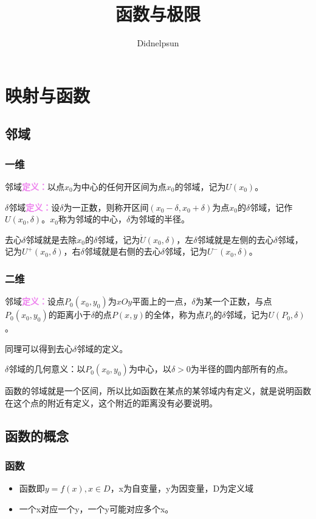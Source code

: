 \documentclass[UTF8, 12pt]{ctexart}
\author{Didnelpsun}
\title{函数与极限}
\date{}
\begin{document}
\renewcommand{\arraystretch}{1.5}
\maketitle
\pagestyle{empty}
\thispagestyle{empty}
\tableofcontents
\thispagestyle{empty}
\newpage
\pagestyle{plain}
\setcounter{page}{1}
\section{映射与函数}
\subsection{邻域}
\subsubsection{一维}

邻域\textcolor{violet}{\textbf{定义：}}以点$x_0$为中心的任何开区间为点$x_0$的邻域，记为$U(x_0)$。

$\delta$邻域\textcolor{violet}{\textbf{定义：}}设$\delta$为一正数，则称开区间$(x_0-\delta,x_0+\delta)$为点$x_0$的$\delta$邻域，记作$U(x_0,\delta)$。$x_0$称为邻域的中心，$\delta$为邻域的半径。

去心$\delta$邻域就是去除$x_0$的$\delta$邻域，记为$\mathring{U}(x_0,\delta)$，左$\delta$邻域就是左侧的去心$\delta$邻域，记为$U^+(x_0,\delta)$，右$\delta$邻域就是右侧的去心$\delta$邻域，记为$U^-(x_0,\delta)$。

\subsubsection{二维}

邻域\textcolor{violet}{\textbf{定义：}}设点$P_0(x_0,y_0)$为$xOy$平面上的一点，$\delta$为某一个正数，与点$P_0(x_0,y_0)$的距离小于$\delta$的点$P(x,y)$的全体，称为点$P_0$的$\delta$邻域，记为$U(P_0,\delta)$。

同理可以得到去心$\delta$邻域的定义。

$\delta$邻域的几何意义：以$P_0(x_0,y_0)$为中心，以$\delta>0$为半径的圆内部所有的点。

函数的邻域就是一个区间，所以比如函数在某点的某邻域内有定义，就是说明函数在这个点的附近有定义，这个附近的距离没有必要说明。

\subsection{函数的概念}
\subsubsection{函数}
\begin{itemize}
    \item 函数即$y=f(x),x\in D$，x为自变量，y为因变量，D为定义域
    \item 一个x对应一个y，一个y可能对应多个x。
\end{itemize}
\end{document}

